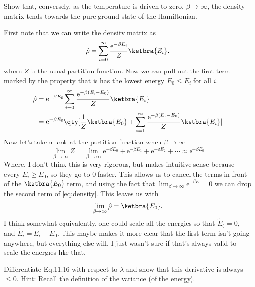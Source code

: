 \documentclass[boxes,pages]{homework}
\makeatletter
\newcommand{\e}{\mathrm{e}}
\numberwithin{@problem}{section}
\makeatother
\begin{document}
\setcounter{section}{11}

\begin{problem}
Show that, conversely, as the temperature is driven to zero, $\beta\to\infty$, the density matrix tends towards the pure ground state of the Hamiltonian.
\end{problem}

\begin{solution}
	First note that we can write the density matrix as
	\begin{equation*}
		\hat{\rho} = \sum_{i = 0}^\infty \frac{\e^{-\beta E_i}}{Z}\ketbra{E_i}.
	\end{equation*}
	where $Z$ is the usual partition function.
	Now we can pull out the first term marked by the property that is has the lowest energy $E_0 \leq E_i$ for all $i$.
	\begin{align}
		\hat{\rho} & = \e^{-\beta E_0}\sum_{i=0}^\infty\frac{\e^{-\beta(E_i - E_0)}}{Z}\ketbra{E_i} \nonumber                                          \\
		           & = \e^{-\beta E_0}\qty[\frac{1}{Z}\ketbra{E_0} + \sum_{i=1}^\infty\frac{\e^{-\beta(E_i - E_0)}}{Z}\ketbra{E_i}] \label{eq:density}
	\end{align}
	Now let's take a look at the partition function when $\beta\to\infty$.
	\begin{equation*}
		\lim_{\beta\to\infty}Z = \lim_{\beta\to\infty}\e^{-\beta E_0} + \e^{-\beta E_1} + \e^{-\beta E_2} + \cdots \approx \e^{-\beta E_0}
	\end{equation*}
	Where, I don't think this is very rigorous, but makes intuitive sense because every $E_i\geq E_0$, so they go to 0 faster.
	This allows us to cancel the terms in front of the $\ketbra{E_0}$ term, and using the fact that $\lim_{\beta\to\infty}\e^{-\beta E} = 0$ we can drop the second term of \cref{eq:density}.
	This leaves us with
	\begin{equation*}
		\lim_{\beta\to\infty}\hat{\rho} = \ketbra{E_0}.
	\end{equation*}
	I think somewhat equivalently, one could scale all the energies so that $\tilde{E}_0 = 0$, and $\tilde{E}_i = E_i - E_0$. This maybe makes it more clear that the first term isn't going anywhere, but everything else will. I just wasn't sure if that's always valid to scale the energies like that.
\end{solution}

\begin{problem}
Differentiate Eq.11.16 with respect to $\lambda$ and show that  this derivative is always $\leq 0$. Hint: Recall the definition of the variance (of the energy).
\end{problem}
\end{document}
